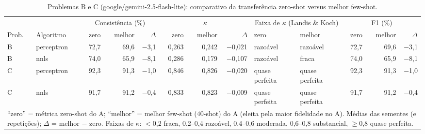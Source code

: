 \begin{table}[htbp]
\centering
\footnotesize
\caption{Problemas B e C (google/gemini-2.5-flash-lite): comparativo da transferência zero-shot versus melhor few-shot.}
\label{tab:T9_comp_flashlite}
\begin{tabular}{llrrrrrrllrrr}
\toprule
 &  & \multicolumn{3}{c}{Consistência (\%)} & \multicolumn{3}{c}{$\kappa$} & \multicolumn{2}{c}{Faixa de $\kappa$ (Landis \& Koch)} & \multicolumn{3}{c}{F1 (\%)} \\ \cmidrule(lr){3-5} \cmidrule(lr){6-8} \cmidrule(lr){9-10} \cmidrule(lr){11-13}
Prob. & Algoritmo & zero & melhor & $\Delta$ & zero & melhor & $\Delta$ & zero & melhor & zero & melhor & $\Delta$ \\
\midrule
B & perceptron & 72,7 & 69,6 & $-$3,1 & 0,263 & 0,242 & $-$0,021 & razoável & razoável & 72,7 & 69,6 & $-$3,1 \\
B & nnls & 74,0 & 65,9 & $-$8,1 & 0,286 & 0,179 & $-$0,107 & razoável & fraca & 74,0 & 65,9 & $-$8,1 \\
\midrule
C & perceptron & 92,3 & 91,3 & $-$1,0 & 0,846 & 0,826 & $-$0,020 & quase perfeita & quase perfeita & 92,3 & 91,3 & $-$1,0 \\
C & nnls & 91,7 & 91,2 & $-$0,4 & 0,833 & 0,823 & $-$0,009 & quase perfeita & quase perfeita & 91,7 & 91,2 & $-$0,4 \\
\bottomrule
\multicolumn{13}{p{0.95\linewidth}}{\footnotesize ``zero'' = métrica zero-shot do A; ``melhor'' = melhor few-shot (40-shot) do A (eleita pela maior fidelidade no A). Médias das sementes (e repetições); $\Delta$ = melhor $-$ zero. Faixas de $\kappa$: $<$0,2 fraca, 0,2–0,4 razoável, 0,4–0,6 moderada, 0,6–0,8 substancial, $\geq$0,8 quase perfeita.} \\
\end{tabular}
\end{table}
